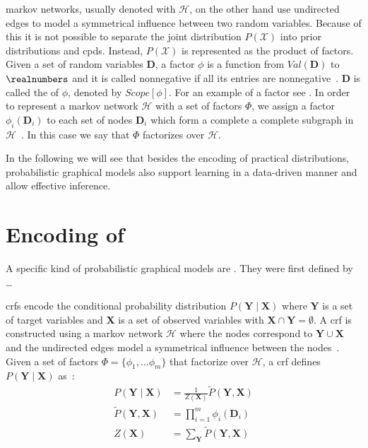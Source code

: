 \Glspl{markov network}, usually denoted with $\mathcal{H}$,  on the other hand use undirected \glspl{edge} to model a symmetrical influence between two \glspl{random variable}.
Because of this it is not possible to separate the \gls{joint distribution} $P(\mathcal{X})$ into \glspl{prior distribution} and \glspl{cpd}.
Instead, $P(\mathcal{X})$ is represented as the product of \glspl{factor}.
Given a set of \glspl{random variable} $\bm{D}$, a \gls{factor} $\phi$ is a function from $Val(\bm{D})$ to $\realnumbers$ and it is called nonnegative if all its entries are nonnegative~\citep{koller2009probabilistic}.
$\bm{D}$ is called the  of $\phi$, denoted by $Scope[\phi]$.
For an example of a factor see .
In order to represent a \gls{markov network} $\mathcal{H}$ with a set of \glspl{factor} $\Phi$, we assign a \gls{factor} $\phi_i(\bm{D}_i)$ to each set of nodes $\bm{D}_i$ which form a complete a complete \gls{subgraph} in $\mathcal{H}$~\citep{koller2009probabilistic}.
In this case we say that $\Phi$ factorizes over $\mathcal{H}$.


In the following we will see that besides the encoding of practical distributions, \glspl{probabilistic graphical model} also support learning in a data-driven manner and allow effective inference.

\section{Encoding of }\label{sec:definition-crfs}
A specific kind of \glspl{probabilistic graphical model} are .
They were first defined by \citet{lafferty2001conditional} \dots

\bigskip

\Glspl{crf} encode the \gls{conditional probability distribution} $P(\bm{Y}\mid\bm{X})$ where $\bm{Y}$ is a set of \glspl{target variable} and $\bm{X}$ is a set of \glspl{observed variable} with $\bm{X}\cap\bm{Y}=\emptyset$.
A \gls{crf} is constructed using a \gls{markov network} $\mathcal{H}$ where the nodes correspond to $\bm{Y}\cup\bm{X}$ and the undirected edges model a symmetrical influence between the nodes~\citep{koller2009probabilistic}.
Given a set of \glspl{factor} $\Phi=\{\phi_1,\dots\phi_m\}$ that factorize over $\mathcal{H}$, a \gls{crf} defines $P(\bm{Y}\mid\bm{X})$ as~\citep{koller2009probabilistic}:
\begin{equation}
  \label{equ:crf}
  \begin{split}
    P(\bm{Y}\mid\bm{X}) & = \frac{1}{Z(\bm{X})}\tilde{P}(\bm{Y},\bm{X}) \\
    \tilde{P}(\bm{Y},\bm{X}) &= \prod_{i=1}^{m}\phi_i(\bm{D}_i) \\
    Z(\bm{X}) & = \sum_{\bm{Y}}\tilde{P}(\bm{Y},\bm{X})
  \end{split}
\end{equation}

